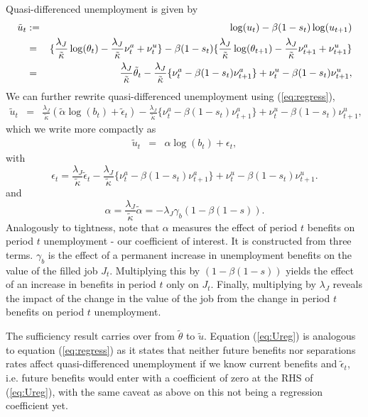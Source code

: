 \documentclass[12pt]{article}
\newcommand{\1}{\mathbf{1}}
\newcommand{\beq}{\begin{eqnarray}}
\newcommand{\eeq}{\end{eqnarray}}
\newcommand{\beqn}{\begin{eqnarray*}}
\newcommand{\eeqn}{\end{eqnarray*}}
\begin{document}
Quasi-differenced unemployment is given by
\beq \label{eq:qdunemp}
\tilde{u}_t & := & \log(u_t) - \beta (1-s_t) \log(u_{t+1}) \\ \notag
& = & \{ \frac{\lambda_J}{\tilde{\kappa}} \log(\theta_t) - \frac{\lambda_J}{\tilde{\kappa}}  \nu^a_t + \nu^u_t \} -
\beta (1-s_t) \{\frac{\lambda_J}{\tilde{\kappa}} \log(\theta_{t+1}) - \frac{\lambda_J}{\tilde{\kappa}}  \nu^a_{t+1} + \nu^u_{t+1} \} \\ \notag
&= & \frac{\lambda_J}{\tilde{\kappa}}  \tilde{\theta}_t  - \frac{\lambda_J}{\tilde{\kappa}} \{ \nu^a_t - \beta (1-s_t) \nu^a_{t+1} \} + \nu^u_t   - \beta (1-s_t) \nu^u_{t+1}, 
\eeq
We can further rewrite quasi-differenced unemployment using (\ref{eq:regress}),
\beqn
\tilde{u}_t &= & \frac{\lambda_J}{\tilde{\kappa}}  (\tilde{\alpha} \log(b_t) + \tilde{\epsilon}_t ) - \frac{\lambda_J}{\tilde{\kappa}} \{ \nu^a_t - \beta (1-s_t) \nu^a_{t+1} \} + \nu^u_t   - \beta (1-s_t) \nu^u_{t+1},
\eeqn
which we write more compactly as
\beq \label{eq:alpha}
\tilde{u}_t & = & \alpha \log(b_t) + \epsilon_t, \label{eq:Ureg}
\eeq
with
$$
\epsilon_t =  \frac{\lambda_J}{\tilde{\kappa}}  \tilde{\epsilon}_t  -  \frac{\lambda_J}{\tilde{\kappa}} \{ \nu^a_t - \beta (1-s_t) \nu^a_{t+1} \} + \nu^u_t   - \beta (1-s_t) \nu^u_{t+1}.
$$
and
$$
\alpha =  \frac{\lambda_J}{\tilde{\kappa}} \tilde{\alpha}  =  -  \lambda_J \gamma_b  (1-\beta (1-s)). 
$$
Analogously to tightness, note that $\alpha$ measures the effect of period $t$ benefits on period $t$ unemployment - our coefficient of interest. It is constructed from three terms. $\gamma_b$ is the effect of a permanent increase in unemployment benefits on the value of the filled job $J_t$. Multiplying this by $(1-\beta (1-s))$ yields the effect of an increase in benefits in period $t$ only on $J_t$. Finally, multiplying by $\lambda_J$ reveals the impact of the change in the value of the job from the change in period $t$ benefits on period $t$ unemployment. %


The sufficiency result carries over from $\tilde{\theta}$ to $\tilde{u}$. Equation (\ref{eq:Ureg}) is analogous to 
 equation (\ref{eq:regress}) as it states that neither future benefits nor separations rates affect quasi-differenced unemployment if we know current benefits and $\tilde{\epsilon}_t$, i.e. future benefits  would enter with a coefficient of zero at the RHS of (\ref{eq:Ureg}), with the same caveat as above on this not being a regression coefficient yet. 
 
\end{document}

